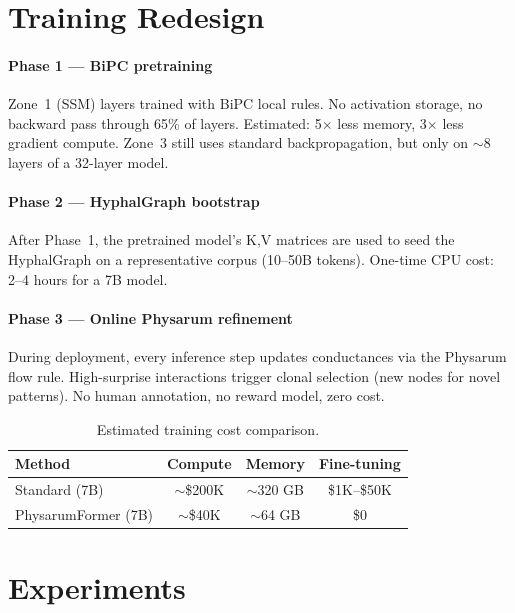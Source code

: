 \documentclass[11pt]{article}
\begin{document}
\section{Training Redesign}
\label{sec:training}

\paragraph{Phase 1 --- BiPC pretraining} Zone~1 (SSM) layers trained with BiPC local rules. No activation storage, no backward pass through 65\% of layers. Estimated: 5$\times$ less memory, 3$\times$ less gradient compute. Zone~3 still uses standard backpropagation, but only on $\sim$8 layers of a 32-layer model.

\paragraph{Phase 2 --- HyphalGraph bootstrap} After Phase~1, the pretrained model's K,V matrices are used to seed the HyphalGraph on a representative corpus (10--50B tokens). One-time CPU cost: 2--4 hours for a 7B model.

\paragraph{Phase 3 --- Online Physarum refinement} During deployment, every inference step updates conductances via the Physarum flow rule. High-surprise interactions trigger clonal selection (new nodes for novel patterns). No human annotation, no reward model, zero cost.

\begin{table}[h]
\centering
\begin{tabular}{lccc}
\toprule
Method & Compute & Memory & Fine-tuning \\
\midrule
Standard (7B) & $\sim$\$200K & $\sim$320 GB & \$1K--\$50K \\
PhysarumFormer (7B) & $\sim$\$40K & $\sim$64 GB & \$0 \\
\bottomrule
\end{tabular}
\caption{Estimated training cost comparison.}
\label{tab:training}
\end{table}

\section{Experiments}
\label{sec:experiments}
\end{document}
